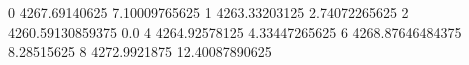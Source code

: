 0 4267.69140625 7.10009765625
1 4263.33203125 2.74072265625
2 4260.59130859375 0.0
4 4264.92578125 4.33447265625
6 4268.87646484375 8.28515625
8 4272.9921875 12.40087890625
